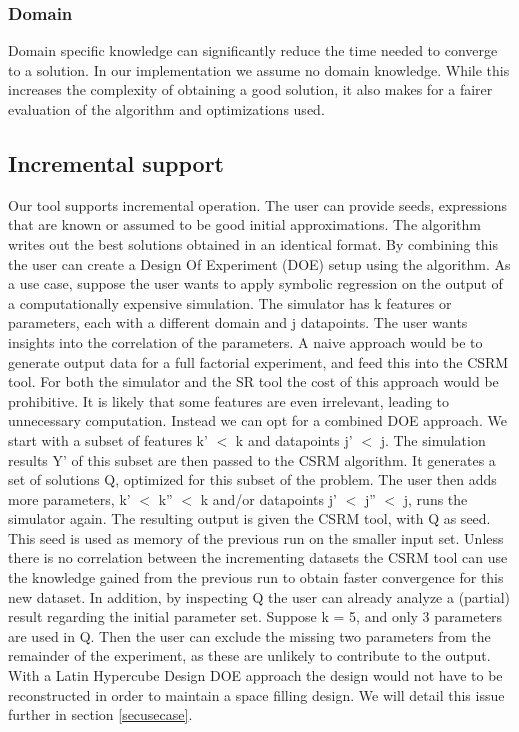 \subsubsection{Domain}
Domain specific knowledge can significantly reduce the time needed to converge to a solution. In our implementation we assume no domain knowledge. While this increases the complexity of obtaining a good solution, it also makes for a fairer evaluation of the algorithm and optimizations used.

\subsection{Incremental support}\label{subsec:incremental}
Our tool supports incremental operation. The user can provide seeds, expressions that are known or assumed to be good initial approximations. The algorithm writes out the best solutions obtained in an identical format. By combining this the user can create a Design Of Experiment (DOE) setup using the algorithm. As a use case, suppose the user wants to apply symbolic regression on the output of a computationally expensive simulation. The simulator has k features or parameters, each with a different domain and j datapoints. The user wants insights into the correlation of the parameters.
A naive approach would be to generate output data for a full factorial experiment, and feed this into the CSRM tool. For both the simulator and the SR tool the cost of this approach would be prohibitive. It is likely that some features are even irrelevant, leading to unnecessary computation. Instead we can opt for a combined DOE approach. We start with a subset of features k' $<$ k and datapoints j' $<$ j. The simulation results Y' of this subset are then passed to the CSRM algorithm. It generates a set of solutions Q, optimized for this subset of the problem.
The user then adds more parameters, k' $<$ k'' $<$ k and/or datapoints j' $<$ j'' $<$ j, runs the simulator again. The resulting output is given the CSRM tool, with Q as seed. This seed is used as memory of the previous run on the smaller input set. Unless there is no correlation between the incrementing datasets the CSRM tool can use the knowledge gained from the previous run to obtain faster convergence for this new dataset. In addition, by inspecting Q the user can already analyze a (partial) result regarding the initial parameter set.
Suppose k = 5, and only 3 parameters are used in Q. Then the user can exclude the missing two parameters from the remainder of the experiment, as these are unlikely to contribute to the output. With a Latin Hypercube Design DOE approach the design would not have to be reconstructed in order to maintain a space filling design. We will detail this issue further in section \ref{secusecase}.
